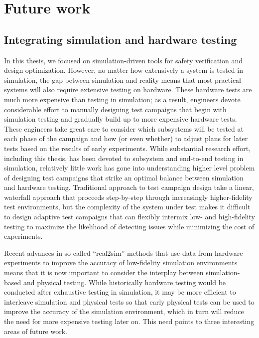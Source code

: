 \section{Future work}

\subsection{Integrating simulation and hardware testing}

In this thesis, we focused on simulation-driven tools for safety verification and design optimization. However, no matter how extensively a system is tested in simulation, the gap between simulation and reality means that most practical systems will also require extensive testing on hardware. These hardware tests are much more expensive than testing in simulation; as a result, engineers devote considerable effort to manually designing test campaigns that begin with simulation testing and gradually build up to more expensive hardware tests. These engineers take great care to consider which subsystems will be tested at each phase of the campaign and how (or even whether) to adjust plans for later tests based on the results of early experiments. While substantial research effort, including this thesis, has been devoted to subsystem and end-to-end testing in simulation, relatively little work has gone into understanding higher level problem of designing test campaigns that strike an optimal balance between simulation and hardware testing. Traditional approach to test campaign design take a linear, waterfall approach that proceeds step-by-step through increasingly higher-fidelity test environments, but the complexity of the system under test makes it difficult to design adaptive test campaigns that can flexibly intermix low- and high-fidelity testing to maximize the likelihood of detecting issues while minimizing the cost of experiments.

Recent advances in so-called ``real2sim'' methods that use data from hardware experiments to improve the accuracy of low-fidelity simulation environments means that it is now important to consider the interplay between simulation-based and physical testing. While historically hardware testing would be conducted after exhaustive testing in simulation, it may be more efficient to interleave simulation and physical tests so that early physical tests can be used to improve the accuracy of the simulation environment, which in turn will reduce the need for more expensive testing later on. This need points to three interesting areas of future work.


